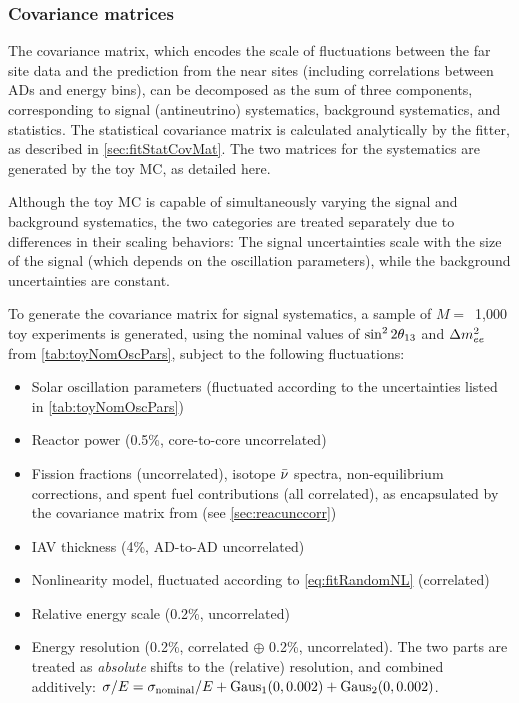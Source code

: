 \documentclass[../thesis.tex]{subfiles}
\begin{document}
\subsubsection{Covariance matrices}

The covariance matrix, which encodes the scale of fluctuations between the far site data and the prediction from the near sites (including correlations between ADs and energy bins), can be decomposed as the sum of three components, corresponding to signal (antineutrino) systematics, background systematics, and statistics. The statistical covariance matrix is calculated analytically by the fitter, as described in \autoref{sec:fitStatCovMat}. The two matrices for the systematics are generated by the toy MC, as detailed here.

Although the toy MC is capable of simultaneously varying the signal and background systematics, the two categories are treated separately due to differences in their scaling behaviors: The signal uncertainties scale with the size of the signal (which depends on the oscillation parameters), while the background uncertainties are constant.

To generate the covariance matrix for signal systematics, a sample of $M =$~1,000 toy experiments is generated, using the nominal values of $\sin^2 2\theta_{13}$ and $\Delta m^2_{ee}$ from \autoref{tab:toyNomOscPars}, subject to the following fluctuations:

\begin{itemize}
\item Solar oscillation parameters (fluctuated according to the uncertainties listed in \autoref{tab:toyNomOscPars})
\item Reactor power (0.5\%, core-to-core uncorrelated)
\item Fission fractions (uncorrelated), isotope $\bar\nu$ spectra, non-equilibrium corrections, and spent fuel contributions (all correlated), as encapsulated by the covariance matrix from \cite{Lewis} (see \autoref{sec:reacunccorr})
\item IAV thickness (4\%, AD-to-AD uncorrelated)
\item Nonlinearity model, fluctuated according to \autoref{eq:fitRandomNL} (correlated)
\item Relative energy scale (0.2\%, uncorrelated)
\item Energy resolution (0.2\%, correlated $\oplus$ 0.2\%, uncorrelated). The two parts are treated as \emph{absolute} shifts to the (relative) resolution, and combined additively: $\sigma/E = \sigma_{\mathrm{nominal}}/E + \operatorname{Gaus}_1(0, 0.002) + \operatorname{Gaus}_2(0, 0.002)$.
\end{itemize}
\end{document}
